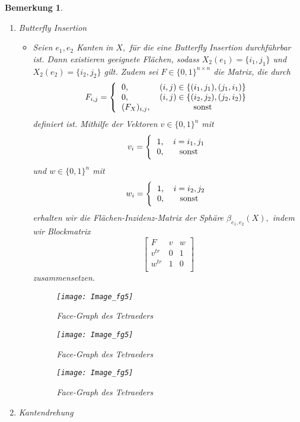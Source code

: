 \documentclass[12pt,titlepage,twoside,cleardoublepage]{article}
\theoremstyle{nummermitklammern}
\newtheorem{bemerkung}[temp]{Bemerkung}
\newtheorem{bemerkung}[zahl]{Bemerkung}
\numberwithin{equation}{section}
\begin{document}
\begin{bemerkung}
\begin{enumerate}
\item Butterfly Insertion
\begin{itemize}
\item Seien $e_1,e_2$ Kanten in $X,$ für die eine Butterfly Insertion durchführbar ist. Dann existieren geeignete Flächen, sodass $X_2(e_1)=\{i_1,j_1\}$ und $X_2(e_2)=\{i_2,j_2\}$ gilt. Zudem sei $F\in \{0,1\}^{n\times n} $ die Matrix, die durch   
\[
F_{i,j}=
\Biggl{\{\begin{tabular}[l]{lcr}
0,&\textcolor{black}{$(i,j)\in \{(i_1,j_1),(j_1,i_1)\}$} \\
0,&\textcolor{black}{$(i,j)\in \{(i_2,j_2),(j_2,i_2)\}$} \\
$(F_{X})_{i,j}$,& sonst\\
\end{tabular}}
\]
definiert ist. Mithilfe der Vektoren $v\in \{0,1\}^n $ mit 
\[
v_{i}=
\Biggl{\{\begin{tabular}[l]{lcr}
1,& $i=i_1,j_1$\\
0,& sonst\\
\end{tabular}}
\]
und $w\in \{0,1\}^n $ mit 
\[
w_{i}=
\Biggl{\{\begin{tabular}[l]{lcr}
1,& $i=i_2,j_2$\\
0,& sonst\\ 
\end{tabular}}
\]
erhalten wir die Flächen-Inzidenz-Matrix der Sphäre $\beta_{e_1,e_2}(X)
,$ indem wir Blockmatrix 
\[
\left[ 
\begin{array}{c|cc} 
  F & v& w \\ 
  \hline 
  v^{tr}& 0 &1 \\
  w^{tr} &1 &0  \\
\end{array} 
\right]
\]
zusammensetzen.
\begin{figure}[H]
\begin{center}
\texttt{[image: Image\_fg5]}
\end{center}
\caption{Face-Graph des Tetraeders}
\end{figure}
\begin{figure}[H]
\begin{center}
\texttt{[image: Image\_fg5]}
\end{center}
\caption{Face-Graph des Tetraeders}
\end{figure}
\begin{figure}[H]
\begin{center}
\texttt{[image: Image\_fg5]}
\end{center}
\caption{Face-Graph des Tetraeders}
\end{figure}
\end{itemize} 
\item Kantendrehung
\begin{itemize} 


\end{itemize}
\end{enumerate}
\end{bemerkung}
\end{document}
